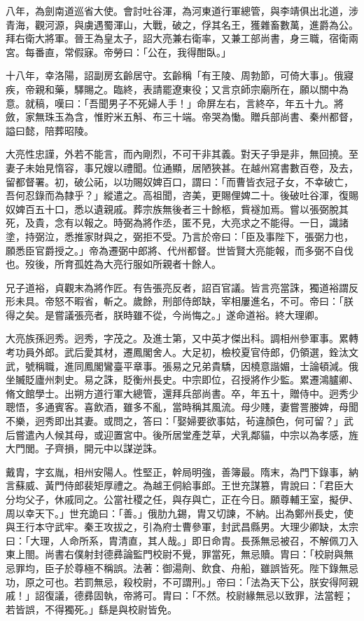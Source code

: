 \begin{pinyinscope}
 八年，為劍南道巡省大使。會討吐谷渾，為河東道行軍總管，與李靖俱出北道，涉青海，觀河源，與虜遇蜀渾山，大戰，破之，俘其名王，獲雜畜數萬，進爵為公。拜右衛大將軍。晉王為皇太子，詔大亮兼右衛率，又兼工部尚書，身三職，宿衛兩宮。每番直，常假寐。帝勞曰：「公在，我得酣臥。」



 十八年，幸洛陽，詔副房玄齡居守。玄齡稱「有王陵、周勃節，可倚大事」。俄寢疾，帝親和藥，驛賜之。臨終，表請罷遼東役；又言京師宗廟所在，願以關中為意。就稿，嘆曰：「吾聞男子不死婦人手！」命屏左右，言終卒，年五十九。將斂，家無珠玉為含，惟貯米五斛、布三十端。帝哭為慟。贈兵部尚書、秦州都督，謚曰懿，陪葬昭陵。



 大亮性忠謹，外若不能言，而內剛烈，不可干非其義。對天子爭是非，無回撓。至妻子未始見惰容，事兄嫂以禮聞。位通顯，居陋狹甚。在越州寫書數百卷，及去，留都督署。初，破公祏，以功賜奴婢百口，謂曰：「而曹皆衣冠子女，不幸破亡，吾何忍錄而為隸乎？」縱遣之。高祖聞，咨美，更賜俚婢二十。後破吐谷渾，復賜奴婢百五十口，悉以遺親戚。葬宗族無後者三十餘柩，貲襚加焉。嘗以張弼脫其死，及貴，念有以報之。時弼為將作丞，匿不見，大亮求之不能得。一日，識諸塗，持弼泣，悉推家財與之，弼拒不受。乃言於帝曰：「臣及事陛下，張弼力也，願悉臣官爵授之。」帝為遷弼中郎將、代州都督。世皆賢大亮能報，而多弼不自伐也。歿後，所育孤姓為大亮行服如所親者十餘人。



 兄子道裕，貞觀末為將作匠。有告張亮反者，詔百官議。皆言亮當誅，獨道裕謂反形未具。帝怒不暇省，斬之。歲餘，刑部侍郎缺，宰相屢進名，不可。帝曰：「朕得之矣。是嘗議張亮者，朕時雖不從，今尚悔之。」遂命道裕。終大理卿。



 大亮族孫迥秀。迥秀，字茂之。及進士第，又中英才傑出科。調相州參軍事。累轉考功員外郎。武后愛其材，遷鳳閣舍人。大足初，檢校夏官侍郎，仍領選，銓汰文武，號稱職，進同鳳閣鸞臺平章事。張易之兄弟貴驕，因橈意諧媚，士論頓減。俄坐贓貶廬州刺史。易之誅，貶衡州長史。中宗即位，召授將作少監。累遷鴻臚卿、脩文館學士。出朔方道行軍大總管，還拜兵部尚書。卒，年五十，贈侍中。迥秀少聰悟，多通賓客。喜飲酒，雖多不亂，當時稱其風流。母少賤，妻嘗詈媵婢，母聞不樂，迥秀即出其妻。或問之，答曰：「娶婦要欲事姑，茍違顏色，何可留？」武后嘗遣內人候其母，或迎置宮中。後所居堂產芝草，犬乳鄰貓，中宗以為孝感，旌大門閭。子齊損，開元中以謀逆誅。



 戴胄，字玄胤，相州安陽人。性堅正，幹局明強，善簿最。隋末，為門下錄事，納言蘇威、黃門侍郎裴矩厚禮之。為越王侗給事郎。王世充謀篡，胄說曰：「君臣大分均父子，休戚同之。公當社稷之任，與存與亡，正在今日。願尊輔王室，擬伊、周以幸天下。」世充詭曰：「善。」俄肋九錫，胄又切諫，不納。出為鄭州長史，使與王行本守武牢。秦王攻拔之，引為府士曹參軍，封武昌縣男。大理少卿缺，太宗曰：「大理，人命所系，胄清直，其人哉。」即日命胄。長孫無忌被召，不解佩刀入東上閤。尚書右僕射封德彞論監門校尉不覺，罪當死，無忌贖。胄曰：「校尉與無忌罪均，臣子於尊極不稱誤。法著：御湯劑、飲食、舟船，雖誤皆死。陛下錄無忌功，原之可也。若罰無忌，殺校尉，不可謂刑。」帝曰：「法為天下公，朕安得阿親戚！」詔復議，德彞固執，帝將可。胄曰：「不然。校尉緣無忌以致罪，法當輕；若皆誤，不得獨死。」繇是與校尉皆免。




\end{pinyinscope}
